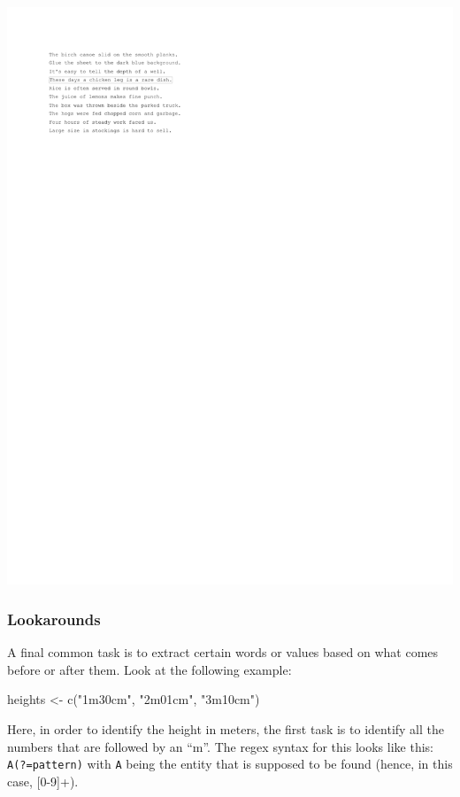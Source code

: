 \documentclass[
]{book}
\newenvironment{Shaded}{\begin{snugshade}}{\end{snugshade}}
\newcommand{\FunctionTok}[1]{\textcolor[rgb]{0.00,0.00,0.00}{#1}}
\newcommand{\NormalTok}[1]{#1}
\newcommand{\OtherTok}[1]{\textcolor[rgb]{0.56,0.35,0.01}{#1}}
\newcommand{\StringTok}[1]{\textcolor[rgb]{0.31,0.60,0.02}{#1}}
\begin{document}
\includegraphics{_main_files/figure-latex/unnamed-chunk-37-2.pdf}

\hypertarget{lookarounds}{%
\subsubsection{Lookarounds}\label{lookarounds}}

A final common task is to extract certain words or values based on what comes before or after them. Look at the following example:

\begin{Shaded}
\begin{Highlighting}[]
\NormalTok{heights }\OtherTok{\textless{}{-}} \FunctionTok{c}\NormalTok{(}\StringTok{"1m30cm"}\NormalTok{, }\StringTok{"2m01cm"}\NormalTok{, }\StringTok{"3m10cm"}\NormalTok{)}
\end{Highlighting}
\end{Shaded}

Here, in order to identify the height in meters, the first task is to identify all the numbers that are followed by an ``m''. The regex syntax for this looks like this: \texttt{A(?=pattern)} with \texttt{A} being the entity that is supposed to be found (hence, in this case, {[}0-9{]}+).
\end{document}
